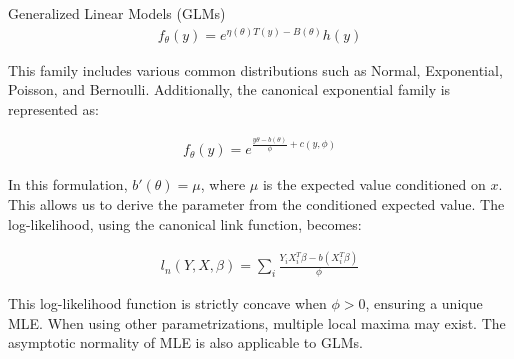 \documentclass{beamer}
\begin{document}
\begin{columns}
\begin{column}{0.3\textwidth}
\begin{block}{Generalized Linear Models (GLMs)}
\begin{align*}
    f_\theta(y) = e^{\eta(\theta)T(y) - B(\theta)} h(y)
\end{align*}

This family includes various common distributions such as Normal, Exponential, Poisson, and Bernoulli. Additionally, the canonical exponential family is represented as:

\begin{align*}
    f_\theta(y) = e^{\frac{y\theta - b(\theta)}{\phi} + c(y, \phi)}
\end{align*}

In this formulation, \(b'(\theta) = \mu\), where \(\mu\) is the expected value conditioned on \(x\). This allows us to derive the parameter from the conditioned expected value. The log-likelihood, using the canonical link function, becomes:

\begin{align*}
    l_n(Y, X, \beta) = \sum_i \frac{Y_i X_i^T \beta - b(X_i^T \beta)}{\phi}
\end{align*}

This log-likelihood function is strictly concave when \(\phi > 0\), ensuring a unique MLE. When using other parametrizations, multiple local maxima may exist. The asymptotic normality of MLE is also applicable to GLMs.

\end{block}


\end{column}
\end{columns}
\end{document}
